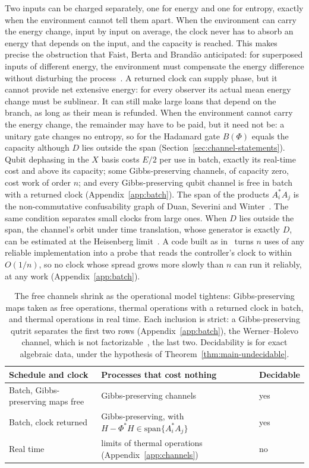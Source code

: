 Two inputs can be charged separately, one for energy and one for entropy, exactly when the environment cannot tell them apart. When the environment can carry the energy change, input by input on average, the clock never has to absorb an energy that depends on the input, and the capacity is reached. This makes precise the obstruction that Faist, Berta and Brand\~ao anticipated: for superposed inputs of different energy, the environment must compensate the energy difference without disturbing the process~\cite{FBB19}. A returned clock can supply phase, but it cannot provide net extensive energy: for every observer its actual mean energy change must be sublinear. It can still make large loans that depend on the branch, as long as their mean is refunded. When the environment cannot carry the energy change, the remainder may have to be paid, but it need not be: a unitary gate changes no entropy, so for the Hadamard gate $B(\Phi)$ equals the capacity although $D$ lies outside the span (Section~\ref{sec:channel-statements}). Qubit dephasing in the $X$ basis costs $E/2$ per use in batch, exactly its real-time cost and above its capacity; some Gibbs-preserving channels, of capacity zero, cost work of order $n$; and every Gibbs-preserving qubit channel is free in batch with a returned clock (Appendix~\ref{app:batch}). The span of the products $A_i^*A_j$ is the non-commutative confusability graph of Duan, Severini and Winter~\cite{DSW13}. The same condition separates small clocks from large ones. When $D$ lies outside the span, the channel's orbit under time translation, whose generator is exactly $D$, can be estimated at the Heisenberg limit~\cite{ZhouJiang21}. A code built as in~\cite[Sec.~V]{ZhouJiang21} turns $n$ uses of any reliable implementation into a probe that reads the controller's clock to within $O(1/n)$, so no clock whose spread grows more slowly than $n$ can run it reliably, at any work (Appendix~\ref{app:batch}).

\begin{table}[tbp]
\centering
\small
\begin{tabular}{>{\raggedright\arraybackslash}p{4.6cm}>{\raggedright\arraybackslash}p{6.6cm}l}
\toprule
Schedule and clock & Processes that cost nothing & Decidable\\
\midrule
Batch, Gibbs-preserving maps free~\cite{FBB21} & Gibbs-preserving channels & yes\\
Batch, clock returned & Gibbs-preserving, with $H-\Phi^*H\in\mathrm{span}\{A_i^*A_j\}$ & yes\\
Real time & limits of thermal operations (Appendix~\ref{app:channels}) & no\\
\bottomrule
\end{tabular}
\caption{The free channels shrink as the operational model tightens: Gibbs-preserving maps taken as free operations, thermal operations with a returned clock in batch, and thermal operations in real time. Each inclusion is strict: a Gibbs-preserving qutrit separates the first two rows (Appendix~\ref{app:batch}), the Werner--Holevo channel, which is not factorizable~\cite{HaagerupMusat11}, the last two. Decidability is for exact algebraic data, under the hypothesis of Theorem~\ref{thm:main-undecidable}.}\label{to:tab:ladder}
\end{table}

